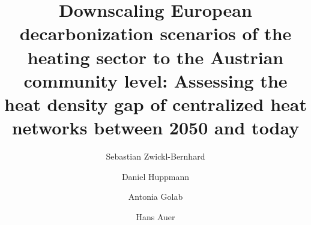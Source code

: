 \documentclass[review]{elsarticle}
\begin{document}
\begin{frontmatter}

\title{Downscaling European decarbonization scenarios of the heating sector to the Austrian community level: Assessing the heat density gap of centralized heat networks between 2050 and today}
\author[1,2]{Sebastian Zwickl-Bernhard}
\author[2]{Daniel Huppmann}
\author[1]{Antonia Golab}
\author[1]{Hans Auer}
\address[1]{Energy Economics Group (EEG), Technische Universität Wien, Gusshausstrasse 25-29/E370-3, 1040 Wien, Austria}
\address[2]{Energy, Climate and Environment (ECE) Program,  International Institute for Applied Systems Analysis (IIASA), Laxenburg, Austria}

\begin{abstract}
	
	
\end{abstract}

\begin{keyword}
\end{keyword}
\end{frontmatter}
\end{document}
